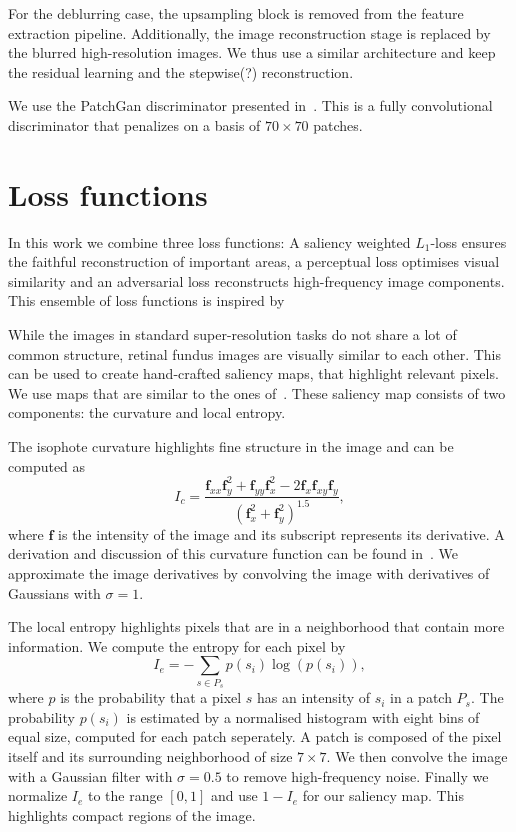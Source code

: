 \documentclass{scrartcl}
\newcommand{\img}{\bm{f}} %
\begin{document}
For the deblurring case, the upsampling block is removed from the feature extraction pipeline.
Additionally, the image reconstruction stage is replaced by the blurred high-resolution images.
We thus use a similar architecture and keep the residual learning and the stepwise(?) reconstruction.

We use the PatchGan discriminator presented in~\cite{PatchGAN}.
This is a fully convolutional discriminator that penalizes on a basis of $70\times70$ patches.



\section{Loss functions}
In this work we combine three loss functions:
A saliency weighted $L_1$-loss ensures the faithful reconstruction of important areas, a perceptual loss optimises visual similarity and an adversarial loss reconstructs high-frequency image components.
This ensemble of loss functions is inspired by~\cite{SaliencyGAN}

While the images in standard super-resolution tasks do not share a lot of common structure, retinal fundus images are visually similar to each other.
This can be used to create hand-crafted saliency maps, that highlight relevant pixels.
We use maps that are similar to the ones of~\cite{SaliencyGAN}.
These saliency map consists of two components: the curvature and local entropy.

The isophote curvature highlights fine structure in the image and can be computed as
\begin{equation}
 I_c = \frac{\img_{xx} \img_y^2 + \img_{yy} \img_x^2 - 2 \img_{x} \img_{xy} \img_{y} }{(\img_x^2 + \img_y^2)^{1.5}},
\end{equation}
where \(\img\) is the intensity of the image and its subscript represents its derivative.
A derivation and discussion of this curvature function can be found in~\cite{Curvature}.
We approximate the image derivatives by convolving the image with derivatives of Gaussians with \(\sigma = 1\).

The local entropy highlights pixels that are in a neighborhood that contain more information.
We compute the entropy for each pixel by
\begin{equation}
  \label{eq:entr}
  I_e = - \sum_{s \in P_s} p(s_i) \log(p(s_i)),
\end{equation}
where \(p\) is the probability that a pixel \(s\) has an intensity of \(s_i\) in a patch \(P_s\).
The probability $p(s_i)$ is estimated by a normalised histogram with eight bins of equal size, computed for each patch seperately.
A patch is composed of the pixel itself and its surrounding neighborhood of size \(7 \times 7\).
We then convolve the image with a Gaussian filter with \(\sigma = 0.5\) to remove high-frequency noise.
Finally we normalize $I_e$ to the range \([0, 1]\) and use $1 - I_e$ for our saliency map.
This highlights compact regions of the image.
\end{document}
